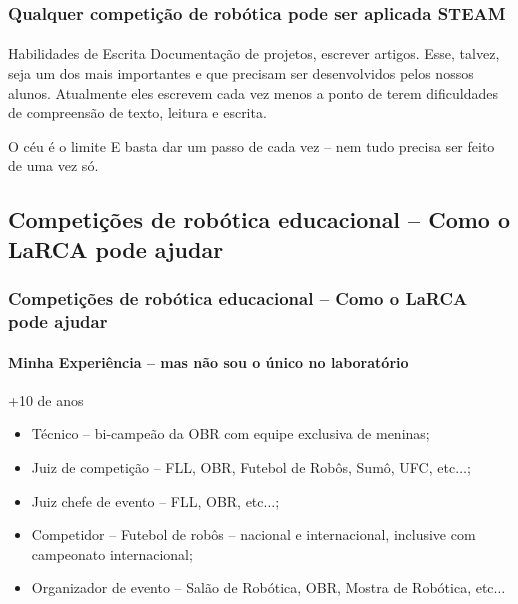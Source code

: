 \documentclass{beamer}
\begin{document}
\begin{frame}
	\frametitle{Qualquer competição de robótica pode ser aplicada STEAM}
	\framesubtitle{}


	\begin{block}{Habilidades de Escrita}
		Documentação de projetos, escrever artigos.
		\linebreak
		\linebreak
		Esse, talvez, seja um dos mais importantes e que precisam ser desenvolvidos pelos nossos alunos. Atualmente eles escrevem cada vez menos a ponto de terem dificuldades de compreensão de texto, leitura e escrita.
	\end{block}

	\begin{block}{O céu é o limite}
		E basta dar um passo de cada vez -- nem tudo precisa ser feito de uma vez só.
	\end{block}

\end{frame}

\subsection{Competições de robótica educacional -- Como o LaRCA pode ajudar}

\begin{frame}
	\frametitle{Competições de robótica educacional -- Como o LaRCA pode ajudar}
	\framesubtitle{Minha Experiência -- mas não sou o único no laboratório}
	\begin{block}{+10 de anos}
		\begin{itemize}
			\item Técnico -- bi-campeão da OBR com equipe exclusiva de meninas;
			\item Juiz de competição -- FLL, OBR, Futebol de Robôs, Sumô, UFC, etc$\dots$;
			\item Juiz chefe de evento -- FLL, OBR, etc$\dots$;
			\item Competidor -- Futebol de robôs -- nacional e internacional, inclusive com campeonato internacional;
			\item Organizador de evento -- Salão de Robótica, OBR, Mostra de Robótica, etc$\dots$
		\end{itemize}
	\end{block}

\end{frame}
\end{document}
